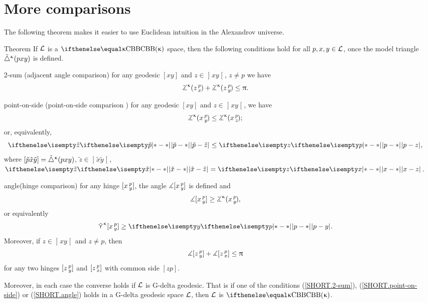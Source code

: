 
\section{More comparisons}\label{sec:more-angles}

The following theorem makes it easier to use Euclidean intuition in the Alexandrov universe.

\begin{thm}{Theorem}
\label{thm:defs_of_alex} 
If $\mathcal{L}$ is a $\Alex\kappa$ space, 
then the following conditions hold for all $p,x,y\in \spc{L}$, once the model triangle ${\tilde\triangle}^{\upkappa}(p x y)$ is defined.

\begin{subthm}{2-sum} 
(adjacent angle comparison) for any geodesic $[x y]$ and $z\in \mathopen{]}x y\mathclose{[}$, $z\not=p$ we have
\[\angk\kappa z p x
+\angk\kappa z p y\le \pi.\]
\end{subthm}

\begin{subthm}{point-on-side}
(point-on-side comparison%
)
for any geodesic $[x y]$ and $z\in \mathopen{]}x y\mathclose{[}$, we have
\[\angk\kappa x p y\le\angk\kappa x p z;\]
or, equivalently, 
\[\dist{\tilde p}{\tilde z}{}\le \dist{p}{z}{},\]
where $[{\tilde p}{\tilde x}{\tilde y}]={\tilde\triangle}^{\upkappa}(p x y)$, $\tilde z\in\mathopen{]} \tilde x\tilde y\mathclose{[}$, $\dist{\tilde x}{\tilde z}{}=\dist{x}{z}{}$.
\end{subthm}

\begin{subthm}{angle}(hinge comparison)
for any hinge $[x\,{}^{p}_{y}]$, the angle 
$\measuredangle[x\,{}^{p}_{y}]$ is defined and 
\[\mangle\hinge x p y\ge\angk\kappa x p y,\]
or equivalently
\[\side\kappa \hinge x p y\ge\dist{p}{y}{}.\]
Moreover, if $z\in\mathopen{]}x y\mathclose{[}$ and $z\not=p$, then 
\[\mangle\hinge z p y + \mangle\hinge z p x\le\pi\]
for any two hinges $[z\,{}^{p}_{y}]$ and $[z\,{}^{p}_{x}]$ with common side $[z p]$.
\end{subthm}

Moreover, in each case the converse holds if $\mathcal{L}$ is G-delta geodesic.
That is if one of the conditions (\ref{SHORT.2-sum}), (\ref{SHORT.point-on-side}) or  (\ref{SHORT.angle}) holds in a  G-delta geodesic space $\mathcal{L}$, then $\mathcal{L}$ is $\Alex\kappa$.
\end{thm}

